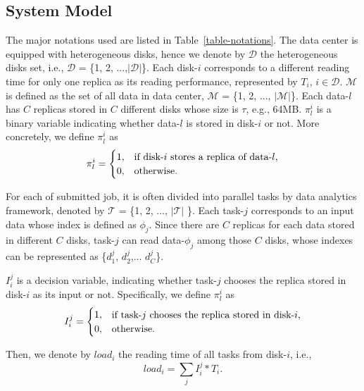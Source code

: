\documentclass[conference]{IEEEtran}
\makeatletter
\newcommand{\tabincell}[2]{\begin{tabular}{@{}#1@{}}#2\end{tabular}}
\makeatother
\begin{document}
\subsection{System Model}

The major notations used are listed in Table~\ref{table-notations}. The data center is equipped with heterogeneous disks, hence we denote by $\mathcal{D}$ the heterogeneous disks set, i.e., $\mathcal{D}$ = \{1, 2, ...,$|\mathcal{D}|$\}. Each disk-$i$ corresponds to a different reading time for only one replica as its reading performance, represented by $T_i$, $i \in \mathcal{D}$.
$\mathcal{M}$ is defined as the set of all data in data center, $\mathcal{M}$ = \{1, 2, ..., $|\mathcal{M}|$\}. Each data-$l$ has $C$ replicas stored in $C$ different disks whose size is $\tau$, e.g., 64MB. $\pi_l^{i}$ is a binary variable indicating whether data-$l$ is stored in disk-$i$ or not. More concretely, we define $\pi_l^{i}$ as
\begin{equation}
\pi_l^{i} =
\begin{cases}
1, &\text{if disk-$i$ stores a replica of data-$l$,}\\
0, &\text{otherwise.}
\end{cases}\nonumber
\vspace{-0.2cm}
\end{equation}

For each of submitted job, it is often divided into parallel tasks by data analytics framework, denoted by $\mathcal{T}$ = \{1, 2,  ..., $\mathcal{|T|}$ \}. Each task-$j$ corresponds to an input data whose index is defined as $\phi_j$. Since there are $C$ replicas for each data stored in different $C$ disks, task-$j$ can read data-$\phi_j$ among those $C$ disks, whose indexes can be represented as \{$d_{1}^j$, $d_{2}^j$,... $d_{C}^j$\}.


$I_i^j$ is a decision variable, indicating whether task-$j$ chooses the replica stored in disk-$i$ as its input or not. Specifically, we define $\pi_l^{i}$ as
\begin{equation}
I_i^j =
\begin{cases}
1, &\text{\tabincell{l}{if task-$j$ chooses the replica stored in disk-$i$,}}\\
0, &\text{otherwise.}
\end{cases}\nonumber
\end{equation}

Then, we denote by $load_i$ the reading time of all tasks from disk-$i$, i.e.,
\begin{equation}
 load_{i} = \sum_{j}I_i^j*T_i. \nonumber
\end{equation}
 
\end{document}
